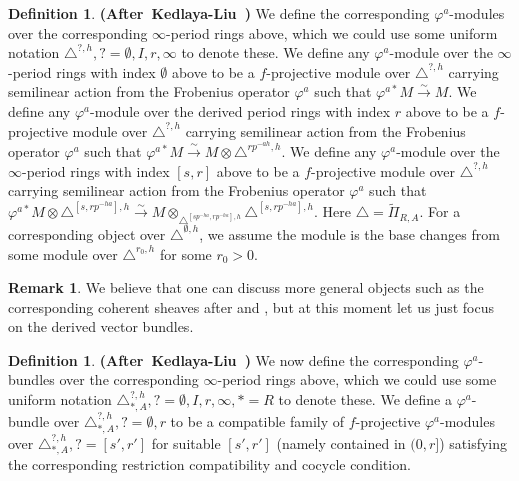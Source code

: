 \documentclass[12pt]{amsart}
\theoremstyle{definition}
\newtheorem{definition}[theorem]{Definition}
\newtheorem{remark}[theorem]{Remark}
\numberwithin{equation}{section}
\begin{document}
\begin{definition} \mbox{\bf{(After Kedlaya-Liu \cite[Definition 4.4.4]{KL2})}}
We define the corresponding $\varphi^a$-modules over the corresponding $\infty$-period rings above, which we could use some uniform notation $\triangle^{?,h},?=\emptyset,I,r,\infty$ to denote these. We define any $\varphi^a$-module over the $\infty$-period rings with index $\emptyset$ above to be a $f$-projective module over $\triangle^{?,h}$ carrying semilinear action from the Frobenius operator $\varphi^a$ such that $\varphi^{a*}M\overset{\sim}{\rightarrow}M$. We define any $\varphi^a$-module over the derived period rings with index $r$ above to be a $f$-projective module over $\triangle^{?,h}$ carrying semilinear action from the Frobenius operator $\varphi^a$ such that $\varphi^{a*}M\overset{\sim}{\rightarrow}M\otimes \triangle^{rp^{-ah},h}$. We define any $\varphi^a$-module over the $\infty$-period rings with index $[s,r]$ above to be a $f$-projective module over $\triangle^{?,h}$ carrying semilinear action from the Frobenius operator $\varphi^a$ such that $\varphi^{a*}M\otimes \triangle^{[s,rp^{-ha}],h}\overset{\sim}{\rightarrow}M\otimes_{\triangle^{[sp^{-ha},rp^{-ha}],h}} \triangle^{[s,rp^{-ha}],h}$. Here $\triangle=\widetilde{\Pi}_{R,A}$. For a corresponding object over $\triangle^{\emptyset,h}$, we assume the module is the base changes from some module over $\triangle^{r_0,h}$ for some $r_0>0$.
\end{definition}


\begin{remark}
We believe that one can discuss more general objects such as the corresponding coherent sheaves after \cite{Lu1} and \cite{Lu2}, but at this moment let us just focus on the derived vector bundles.	
\end{remark}



\begin{definition} \mbox{\bf{(After Kedlaya-Liu \cite[Definition 4.4.6]{KL2})}}
We now define the corresponding $\varphi^a$-bundles over the corresponding $\infty$-period rings above, which we could use some uniform notation $\triangle_{*,A}^{?,h},?=\emptyset,I,r,\infty,*=R$ to denote these. We define a $\varphi^a$-bundle over $\triangle_{*,A}^{?,h},?=\emptyset,r$ to be a compatible family of $f$-projective $\varphi^a$-modules over $\triangle_{*,A}^{?,h},?=[s',r']$ for suitable $[s',r']$ (namely contained in $(0,r]$) satisfying the corresponding restriction compatibility and cocycle condition.
\end{definition}
\end{document}
